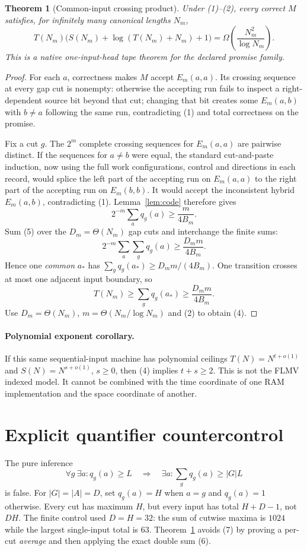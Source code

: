 \documentclass[11pt]{article}
\newtheorem{theorem}{Theorem}
\begin{document}
\begin{theorem}[Common-input crossing product]\label{th:product}
Under (1)--(2), every correct $M$ satisfies, for infinitely many canonical lengths $N_m$,
\[
 T(N_m)\bigl(S(N_m)+\log(T(N_m)+N_m)+1\bigr)
        =\Omega\!\left(\frac{N_m^2}{\log N_m}\right). \tag{4}
\]
This is a native one-input-head tape theorem for the declared promise family.
\end{theorem}
\begin{proof}
For each $a$, correctness makes $M$ accept $E_m(a,a)$.  Its crossing sequence at every gap cut is nonempty: otherwise the accepting run fails to inspect a right-dependent source bit beyond that cut; changing that bit creates some $E_m(a,b)$ with $b\ne a$ following the same run, contradicting (1) and total correctness on the promise.

Fix a cut $g$.  The $2^m$ complete crossing sequences for $E_m(a,a)$ are pairwise distinct.  If the sequences for $a\ne b$ were equal, the standard cut-and-paste induction, now using the full work configurations, control and directions in each record, would splice the left part of the accepting run on $E_m(a,a)$ to the right part of the accepting run on $E_m(b,b)$.  It would accept the inconsistent hybrid $E_m(a,b)$, contradicting (1).  Lemma~\ref{lem:code} therefore gives
\[
              2^{-m}\sum_a q_g(a)\ge \frac{m}{4B_m}. \tag{5}
\]
Sum (5) over the $D_m=\Theta(N_m)$ gap cuts and interchange the finite sums:
\[
 2^{-m}\sum_a\sum_gq_g(a)\ge\frac{D_m m}{4B_m}. \tag{6}
\]
Hence one \emph{common} $a_*$ has $\sum_gq_g(a_*)\ge D_m m/(4B_m)$.  One transition crosses at most one adjacent input boundary, so
\[
 T(N_m)\ge\sum_gq_g(a_*)\ge\frac{D_m m}{4B_m}.
\]
Use $D_m=\Theta(N_m)$, $m=\Theta(N_m/\log N_m)$ and (2) to obtain (4).
\end{proof}

\paragraph{Polynomial exponent corollary.}
If this same sequential-input machine has polynomial ceilings $T(N)=N^{t+o(1)}$ and $S(N)=N^{s+o(1)}$, $s\ge0$, then (4) implies $t+s\ge2$.  This is not the FLMV indexed model.  It cannot be combined with the time coordinate of one RAM implementation and the space coordinate of another.

\section{Explicit quantifier countercontrol}
The pure inference
\[
        \forall g\ \exists a:q_g(a)\ge L
        \quad\Longrightarrow\quad
        \exists a:\sum_gq_g(a)\ge |G|L \tag{7}
\]
is false.  For $|G|=|A|=D$, set $q_g(a)=H$ when $a=g$ and $q_g(a)=1$ otherwise.  Every cut has maximum $H$, but every input has total $H+D-1$, not $DH$.  The finite control used $D=H=32$: the sum of cutwise maxima is $1024$ while the largest single-input total is $63$.  Theorem~\ref{th:product} avoids (7) by proving a per-cut \emph{average} and then applying the exact double sum (6).
\end{document}
